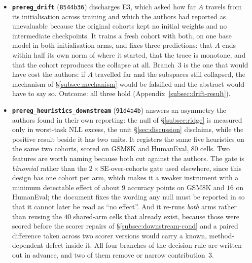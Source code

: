 \begin{itemize}
\item \textbf{\texttt{prereg\_drift}} (\texttt{8544b36}) discharges E3,
which asked how far $A$ travels from its initialisation across training and
which the authors had reported as unevaluable because the original cohorts kept no
initial weights and no intermediate checkpoints. It trains a fresh cohort with
both, on one base model in both initialisation arms, and fixes three
predictions: that $A$ ends within half its own norm of where it started, that
the trace is monotone, and that the cohort reproduces the collapse at all.
Branch~3 is the one that would have cost the authors: if $A$ travelled far and the
subspaces still collapsed, the mechanism of \S\ref{subsec:mechanism} would be
falsified and the abstract would have to say so. Outcome: all three hold
(Appendix~\ref{subsec:drift-result}).

\item \textbf{\texttt{prereg\_heuristics\_downstream}} (\texttt{91d4a4b})
answers an asymmetry the authors found in their own reporting: the null of
\S\ref{subsec:ridge} is measured only in worst-task NLL excess, the unit
\S\ref{sec:discussion} disclaims, while the positive result beside it has
two units. It registers the same five heuristics on the same two cohorts,
scored on GSM8K and HumanEval, $80$ cells. Two features are worth naming
because both cut against the authors. The gate is \emph{binomial} rather than the
$2\times\mathrm{SE}$-over-cohorts gate used elsewhere, since this design has
one cohort per arm, which makes it a weaker instrument with a minimum
detectable effect of about $9$ accuracy points on GSM8K and $16$ on
HumanEval; the document fixes the wording any null must be reported in so
that it cannot later be read as ``no effect''. And it re-runs \emph{both}
arms rather than reusing the $40$ shared-arm cells that already exist,
because those were scored before the scorer repairs of
\S\ref{subsec:downstream-cond} and a paired difference taken across two
scorer versions would carry a known, method-dependent defect inside it. All
four branches of the decision rule are written out in advance, and two of
them remove or narrow contribution~3.
\end{itemize}

